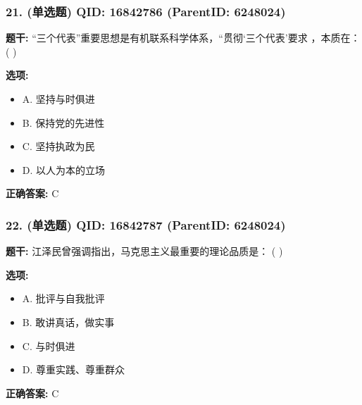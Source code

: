 \documentclass[12pt,UTF8]{ctexart}
\begin{document}
\vspace{0.3em}\hrulefill\vspace{0.7em}

\subsubsection*{21. (单选题) \small QID: 16842786 (ParentID: 6248024)}

\textbf{题干:}
“三个代表”重要思想是有机联系科学体系，“贯彻‘三个代表’要求 ，本质在： ( )



\textbf{选项:}
\begin{itemize}[leftmargin=*]

  \item A. 坚持与时俱进

  \item B. 保持党的先进性

  \item C. 坚持执政为民

  \item D. 以人为本的立场

\end{itemize}

\textbf{正确答案:}
C

\vspace{0.3em}\hrulefill\vspace{0.7em}

\subsubsection*{22. (单选题) \small QID: 16842787 (ParentID: 6248024)}

\textbf{题干:}
江泽民曾强调指出，马克思主义最重要的理论品质是： ( )



\textbf{选项:}
\begin{itemize}[leftmargin=*]

  \item A. 批评与自我批评

  \item B. 敢讲真话，做实事

  \item C. 与时俱进

  \item D. 尊重实践、尊重群众

\end{itemize}

\textbf{正确答案:}
C
\end{document}
